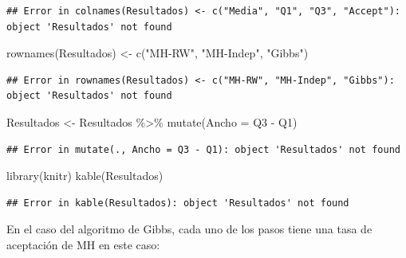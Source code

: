\documentclass[
  12pt,
]{book}
\newenvironment{Shaded}{\begin{snugshade}}{\end{snugshade}}
\newcommand{\AttributeTok}[1]{\textcolor[rgb]{0.77,0.63,0.00}{#1}}
\newcommand{\FunctionTok}[1]{\textcolor[rgb]{0.00,0.00,0.00}{#1}}
\newcommand{\NormalTok}[1]{#1}
\newcommand{\OtherTok}[1]{\textcolor[rgb]{0.56,0.35,0.01}{#1}}
\newcommand{\SpecialCharTok}[1]{\textcolor[rgb]{0.00,0.00,0.00}{#1}}
\newcommand{\StringTok}[1]{\textcolor[rgb]{0.31,0.60,0.02}{#1}}
\theoremstyle{definition}
\theoremstyle{definition}
\theoremstyle{definition}
\theoremstyle{definition}
\theoremstyle{remark}
\begin{document}
\begin{verbatim}
## Error in colnames(Resultados) <- c("Media", "Q1", "Q3", "Accept"): object 'Resultados' not found
\end{verbatim}

\begin{Shaded}
\begin{Highlighting}[]
\FunctionTok{rownames}\NormalTok{(Resultados) }\OtherTok{\textless{}{-}} \FunctionTok{c}\NormalTok{(}\StringTok{"MH{-}RW"}\NormalTok{, }\StringTok{"MH{-}Indep"}\NormalTok{, }\StringTok{"Gibbs"}\NormalTok{)}
\end{Highlighting}
\end{Shaded}

\begin{verbatim}
## Error in rownames(Resultados) <- c("MH-RW", "MH-Indep", "Gibbs"): object 'Resultados' not found
\end{verbatim}

\begin{Shaded}
\begin{Highlighting}[]
\NormalTok{Resultados }\OtherTok{\textless{}{-}}\NormalTok{ Resultados }\SpecialCharTok{\%\textgreater{}\%}
    \FunctionTok{mutate}\NormalTok{(}\AttributeTok{Ancho =}\NormalTok{ Q3 }\SpecialCharTok{{-}}\NormalTok{ Q1)}
\end{Highlighting}
\end{Shaded}

\begin{verbatim}
## Error in mutate(., Ancho = Q3 - Q1): object 'Resultados' not found
\end{verbatim}

\begin{Shaded}
\begin{Highlighting}[]
\FunctionTok{library}\NormalTok{(knitr)}
\FunctionTok{kable}\NormalTok{(Resultados)}
\end{Highlighting}
\end{Shaded}

\begin{verbatim}
## Error in kable(Resultados): object 'Resultados' not found
\end{verbatim}

En el caso del algoritmo de Gibbs, cada uno de los pasos tiene una tasa de aceptación de MH en este caso:

\begin{Shaded}
\end{Shaded}
\end{document}
